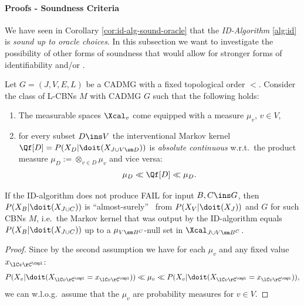 \paragraph{Proofs - Soundness Criteria}


We have seen in Corollary \ref{cor:id-alg-sound-oracle} that the \emph{ID-Algorithm} \ref{alg:id} is \emph{sound up to oracle choices}.
In this subsection we want to investigate the possibility of other forms of soundness that would allow for stronger forms of identifiability and/or \trackability.






\begin{Thm}
    \label{thm:ID-as-soundness-prf}
    Let $G=(J,V,E,L)$ be a CADMG with a fixed topological order $<$. 
    Consider the class of L-CBNs $M$ with \observational CADMG $G$ such that the following holds: 
    \begin{enumerate}
        \item The measurable spaces $\Xcal_v$ come equipped with a measure $\mu_v$, $v \in V$,
        \item for every subset $D \ins V$ the interventional Markov kernel $\Qf[D]=P(X_D|\doit(X_{J \cup V \sm D}))$ is
            \emph{absolute continuous} w.r.t.\ the product measure $\mu_D:=\otimes_{v \in D} \mu_v$ and vice versa:
            \[ \mu_D \ll \Qf[D] \ll \mu_D.   \]
    \end{enumerate}
    If the ID-algorithm does not produce FAIL for input $B, C \ins G$,
    then $P(X_B|\doit(X_{J \cup C}))$ is ``almost-surely'' \trackable\ from $P(X_V|\doit(X_J))$ and $G$ for such CBNs $M$, 
    i.e.\ the Markov kernel that was output by the ID-algorithm equals $P(X_B|\doit(X_{J \cup C}))$ up to a
    $\mu_{V\sm B^C}$-null set in $\Xcal_{J \cup V\sm B^C}$.
    \begin{proof}
        Since by the second assumption we have for each $\mu_v$ and any fixed value $x_{\lC v \rC^\cmpl}$:
        \[  P(X_v|\doit(X_{\lC v \rC^\cmpl}=x_{\lC v \rC^\cmpl})) \ll \mu_v \ll P(X_v|\doit(X_{\lC v \rC^\cmpl}=x_{\lC v \rC^\cmpl})),  \]
        we can w.l.o.g.\ assume that the $\mu_v$ are probability measures for $v \in V$.
       

\end{proof}
\end{Thm}

